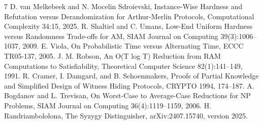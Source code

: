\documentclass[11pt]{article}
\begin{document}
\begin{thebibliography}{7}
 D. van Melkebeek and N. Mocelin Sdroievski, Instance-Wise Hardness and Refutation versus Derandomization for Arthur-Merlin Protocols, Computational Complexity 34:15, 2025.
 R. Shaltiel and C. Umans, Low-End Uniform Hardness versus Randomness Trade-offs for AM, SIAM Journal on Computing 39(3):1006--1037, 2009.
 E. Viola, On Probabilistic Time versus Alternating Time, ECCC TR05-137, 2005.
 J. M. Robson, An O(T log T) Reduction from RAM Computations to Satisfiability, Theoretical Computer Science 82(1):141--149, 1991.
 R. Cramer, I. Damgard, and B. Schoenmakers, Proofs of Partial Knowledge and Simplified Design of Witness Hiding Protocols, CRYPTO 1994, 174--187.
 A. Bogdanov and L. Trevisan, On Worst-Case to Average-Case Reductions for NP Problems, SIAM Journal on Computing 36(4):1119--1159, 2006.
 H. Randriambololona, The Syzygy Distinguisher, arXiv:2407.15740, version 2025.
\end{thebibliography}
\end{document}
